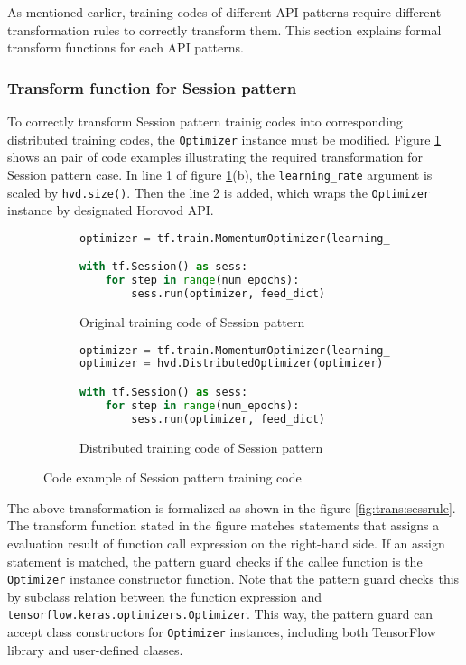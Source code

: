 As mentioned earlier, training codes of different API patterns
require different transformation rules to correctly transform them.
This section explains formal transform functions for each API patterns.

\subsubsection{Transform function for Session pattern}

To correctly transform Session pattern trainig codes into corresponding
distributed training codes, the {\tt Optimizer} instance must be modified.
Figure \ref{fig:trans:sessiontrans} shows an pair of code examples
illustrating the required transformation for Session pattern case.
In line 1 of figure \ref{fig:trans:sessiontrans}(b),
the {\tt learning\_rate} argument is scaled by {\tt hvd.size()}.
Then the line 2 is added, which wraps the {\tt Optimizer} instance
by designated Horovod API.

\begin{figure}[ht!]
  \begin{subfigure}[t]{0.45\textwidth}
    \begin{lstlisting}[language=Python]
optimizer = tf.train.MomentumOptimizer(learning_rate = 0.01)

with tf.Session() as sess:
    for step in range(num_epochs): 
        sess.run(optimizer, feed_dict)
    \end{lstlisting}
    \caption{Original training code of Session pattern}
  \end{subfigure}
  \hspace{5mm}
  \begin{subfigure}[t]{0.45\textwidth}
    \begin{lstlisting}[language=Python]
optimizer = tf.train.MomentumOptimizer(learning_rate = 0.01 * hvd.size())
optimizer = hvd.DistributedOptimizer(optimizer)

with tf.Session() as sess:
    for step in range(num_epochs): 
        sess.run(optimizer, feed_dict)
    \end{lstlisting}
    \caption{Distributed training code of Session pattern}
  \end{subfigure}
  \caption{Code example of Session pattern training code}
  \label{fig:trans:sessiontrans}
\end{figure}

The above transformation is formalized as shown in the figure 
\ref{fig:trans:sessrule}. The transform function stated in the figure
matches statements that assigns a evaluation result of function call expression
on the right-hand side.
If an assign statement is matched, the pattern guard checks if the
callee function is the {\tt Optimizer} instance constructor function.
Note that the pattern guard checks this by subclass relation between
the function expression and {\tt tensorflow.keras.optimizers.Optimizer}.
This way, the pattern guard can accept class constructors for {\tt Optimizer}
instances, including both TensorFlow library and user-defined classes.

